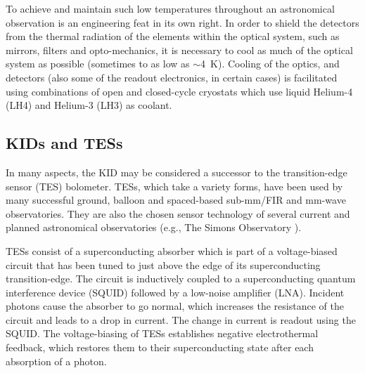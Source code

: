 To achieve and maintain such low temperatures throughout an astronomical observation is an engineering feat in its own right. In order to shield the detectors from the thermal radiation of the elements within the optical system, such as mirrors, filters and opto-mechanics, it is necessary to cool as much of the optical system as possible (sometimes to as low as $\sim$4~K). Cooling of the optics, and detectors (also some of the readout electronics, in certain cases) is facilitated using combinations of open and closed-cycle cryostats which use liquid Helium-4 (LH4) and Helium-3 (LH3) as coolant.

\subsection{KIDs and TESs}

In many aspects, the KID may be considered a successor to the transition-edge sensor (TES) bolometer. TESs, which take a variety forms, have been used by many successful ground, balloon and spaced-based sub-mm/FIR and mm-wave observatories. They are also the chosen sensor technology of several current and planned astronomical observatories (e.g., The Simons Observatory \citep{ade2019simons}).

TESs consist of a superconducting absorber which is part of a voltage-biased circuit that has been tuned to just above the edge of its superconducting transition-edge. The circuit is inductively coupled to a superconducting quantum interference device (SQUID) followed by a low-noise amplifier (LNA). Incident photons cause the absorber to go normal, which increases the resistance of the circuit and leads to a drop in current. The change in current is readout using the SQUID. The voltage-biasing of TESs establishes negative electrothermal feedback, which restores them to their superconducting state after each absorption of a photon.

